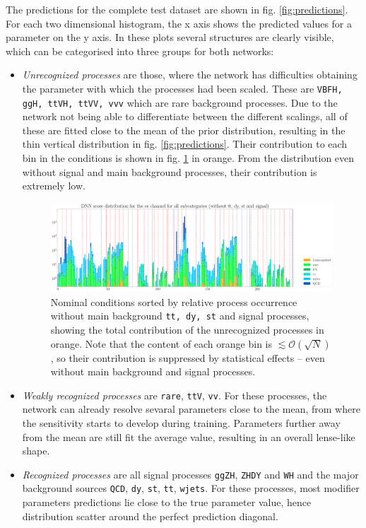 The predictions for the complete test dataset are shown in fig. \ref{fig:predictions}. For each two dimensional histogram, the x axis shows the predicted values for a parameter on the y axis. In these plots several structures are clearly visible, which can be categorised into three groups for both networks:

\begin{itemize}
	\item[] \textit{Unrecognized processes} are those, where the network has difficulties obtaining the parameter with which the processes had been scaled. These are \texttt{VBFH, ggH, ttVH, ttVV, vvv} which are rare background processes. Due to the network not being able to differentiate between the different scalings, all of these are fitted close to the mean of the prior distribution, resulting in the thin vertical distribution in fig. \ref{fig:predictions}. Their contribution to each bin in the conditions is shown in fig. \ref{fig:cond_without_sig_bkg} in orange. From the distribution even without signal and main background processes, their contribution is extremely low.
	
	\begin{figure}[h!]
		\centering
		\includegraphics[width=\linewidth]{figures/inference/cond4_sorted_no_main_bkg_no_sig.pdf}
		\caption{Nominal conditions sorted by relative process occurrence without main background \texttt{tt, dy, st} and signal processes, showing the total contribution of the unrecognized processes in orange. Note that the content of each orange bin is $\lesssim\mathcal{O}(\sqrt{N})$, so their contribution is suppressed by statistical effects -- even without main background and signal processes.}
		\label{fig:cond_without_sig_bkg}
	\end{figure}
	
	\item[] \textit{Weakly recognized processes} are \texttt{rare}, \texttt{ttV}, \texttt{vv}. For these processes, the network can already resolve sevaral parameters close to the mean, from where the sensitivity starts to develop during training. Parameters further away from the mean are still fit the average value, resulting in an overall lense-like shape.
	\item[] \textit{Recognized processes} are all signal processes \texttt{ggZH}, \texttt{ZHDY} and \texttt{WH} and the major background sources \texttt{QCD}, \texttt{dy}, \texttt{st}, \texttt{tt}, \texttt{wjets}. For these processes, most modifier parameters predictions lie close to the true parameter value, hence distribution scatter around the perfect prediction diagonal.
\end{itemize}

